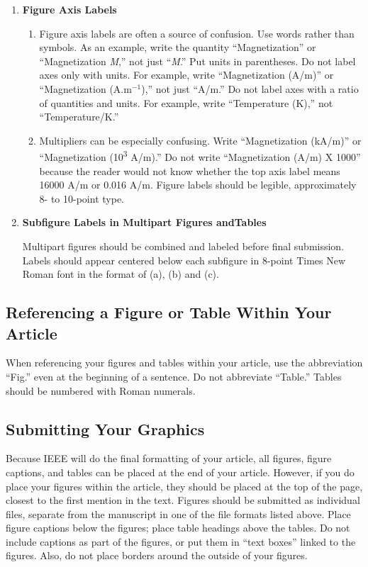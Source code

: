 \documentclass[letter]{IEEEtaes}
\begin{document}
\begin{enumerate}
\def\labelenumi{\arabic{enumi})}
\item
  \textbf{Figure Axis Labels}

  \begin{enumerate}
  \def\labelenumii{\alph{enumii})}
  \item
    Figure axis labels are often a source of confusion. Use words rather
    than symbols. As an example, write the quantity ``Magnetization'' or
    ``Magnetization \emph{M},'' not just ``\emph{M}.'' Put units in
    parentheses. Do not label axes only with units. For example, write
    ``Magnetization (A/m)'' or ``Magnetization
    (A.m$^{{-}1}$),'' not just ``A/m.'' Do not label axes with
    a ratio of quantities and units. For example, write ``Temperature
    (K),'' not ``Temperature/K.''
  \item
    Multipliers can be especially confusing. Write ``Magnetization
    (kA/m)'' or ``Magnetization (10\textsuperscript{3} A/m).'' Do not
    write ``Magnetization (A/m) X 1000'' because the reader would not
    know whether the top axis label means 16000 A/m or 0.016 A/m. Figure
    labels should be legible, approximately 8- to 10-point type.
  \end{enumerate}
\item
  \textbf{Subfigure Labels in Multipart Figures and\break Tables}

  Multipart figures should be combined and labeled before final submission. Labels should appear centered below each subfigure in 8-point Times New Roman font in the format of (a), (b) and (c).
\end{enumerate}

\subsection{Referencing a Figure or Table Within Your Article}

When referencing your figures and tables within your article, use the abbreviation ``Fig.'' even at the beginning of a sentence. Do not abbreviate ``Table.'' Tables should be numbered with Roman numerals.

\subsection{Submitting Your Graphics}

Because IEEE will do the final formatting of your article, all figures, figure captions, and tables can be placed at the end of your article. However, if you do place your figures within the article, they should be placed at the top of the page, closest to the first mention in the text. Figures should be submitted as individual files, separate from the manuscript in one of the file formats listed above. Place figure captions below the figures; place table headings above the tables. Do not include captions as part of the figures, or put them in ``text boxes'' linked to the figures. Also, do not place borders around the outside of your figures.
\end{document}
